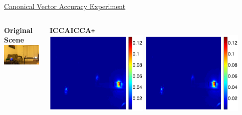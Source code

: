 \documentclass[8pt]{beamer}
\newcommand{\iccap}{ICCA\texttt{+} }
\begin{document}
\begin{frame}{\href{run:/home/asendorf/Documents/thesis_videos/flashing_video2.mp4}{Canonical Vector Accuracy Experiment}}

\begin{columns}[T]
  \begin{column}{0.3\textwidth}
    \vspace{15ex}
    \begin{center}
    \textbf{Original Scene}
    \includegraphics[width=\textwidth]{figures/flashing_left.png}
\end{center}
  \end{column}
  \begin{column}{0.7\textwidth}
    \begin{center}
      \textbf{ICCA}\hspace{20ex}\textbf{\iccap}\phantom{blah}\\
      \includegraphics[width=0.45\textwidth]{figures/flashing1_left1_icca.pdf}\hspace{2ex}
      \includegraphics[width=0.45\textwidth]{figures/flashing1_left1_opt.pdf}\\[2ex]

\end{center}
\end{column}
\end{columns}
\end{frame}
\end{document}
